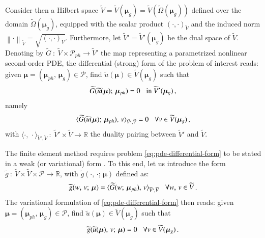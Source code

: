 \documentclass{elsarticle}
\numberwithin{equation}{section}
\theoremstyle{theorem}
\theoremstyle{definition}
\theoremstyle{remark}
\theoremstyle{proposition}
\numberwithin{figure}{section}
\newcommand{\norm}[1]{\left\lVert#1\right\rVert}
\newcommand{\wt}[1]{\widetilde{#1}}
\newcommand{\bg}[1]{\boldsymbol{#1}}
\begin{document}
		Consider then a Hilbert space $\wt{V} = \wt{V}(\bg{\mu}_g) = \wt{V}(\wt{\Omega}(\boldsymbol{\mu}_g))$ defined over the domain $\wt{\Omega}(\boldsymbol{\mu}_g)$, equipped with the scalar product $(\cdot, \cdot)_{\wt{V}}$ and the induced norm $\norm{\cdot}_{\wt{V}} = \sqrt{(\cdot, \cdot)_{\wt{V}}}$. Furthermore, let $\wt{V}' = \wt{V}'(\boldsymbol{\mu}_g)$ be the dual space of $\wt{V}$. Denoting by $\wt{G} ~ : ~ \wt{V} \times \mathcal{P}_{ph} \rightarrow \wt{V}'$ the map representing a parametrized nonlinear second-order PDE, the differential (strong) form of the problem of interest reads: given $\bg{\mu} = (\bg{\mu}_{ph}, \, \bg{\mu}_g) \in \mathcal{P}$, find $\wt{u}(\boldsymbol{\mu}) \in \wt{V}(\bg{\mu}_g)$ such that
		\begin{equation}
			\label{eq:pde-differential-form}
			\wt{G}(\wt{u}(\bg{\mu}); \, \bg{\mu}_{ph}) = 0 \hspace*{0.3cm} \text{in $\wt{V}'(\bg{\mu}_g)$} \, ,
		\end{equation}
		namely
		\begin{equation*}
			\langle \wt{G}(\wt{u}(\bg{\mu}); \, \bg{\mu}_{ph}), \, v \rangle_{\wt{V}',\wt{V}} = 0 \hspace*{0.3cm} \forall v \in \wt{V}(\bg{\mu}_g) \, ,
		\end{equation*}
		with $\langle \cdot, \, \cdot \rangle_{\wt{V}',\wt{V}} ~ : ~ \wt{V}' \times \wt{V} \rightarrow \mathbb{R}$ the duality pairing between $\wt{V}'$ and $\wt{V}$. %
		
		The finite element method requires problem \eqref{eq:pde-differential-form} to be stated in a weak (or variational) form \cite{Qua10}. To this end, let us introduce the form $\wt{g} ~ : ~ \wt{V} \times \wt{V} \times \mathcal{P} \rightarrow \mathbb{R}$, with $\wt{g}(\cdot, \, \cdot; \, \bg{\mu})$ defined as:
		\begin{equation*}
			\wt{g}(w, \, v; \, \bg{\mu}) = \langle \wt{G}(w; \, \bg{\mu}_{ph}), \, v \rangle_{\wt{V}',\wt{V}} \hspace*{0.3cm} \forall w, \, v \in \wt{V} \, .
		\end{equation*}
		The variational formulation of \eqref{eq:pde-differential-form} then reads: given $\bg{\mu} = (\bg{\mu}_{ph}, \, \bg{\mu}_g) \in \mathcal{P}$, find $\wt{u}(\bg{\mu}) \in \wt{V}(\bg{\mu}_g)$ such that
		\begin{equation*}
			\label{eq:pde-variational-form}
			\wt{g}(\wt{u}(\bg{\mu}), \, v; \, \bg{\mu}) = 0 \hspace*{0.3cm} \forall v \in \wt{V}(\bg{\mu}_g) \, .
		\end{equation*}
		
\end{document}
